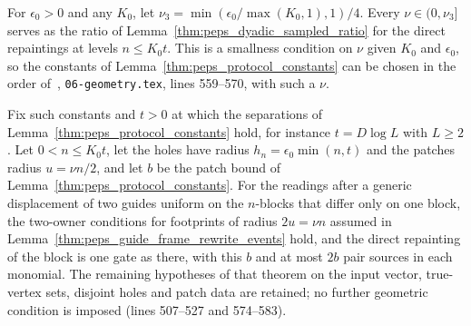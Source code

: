 \begin{lemma}
    \label{thm:peps_dyadic_direct_repainting_constants}
    \leanok
    For $\epsilon_0>0$ and any $K_0$, let
    $\nu_3=\min(\epsilon_0/\max(K_0,1),1)/4$. Every $\nu\in(0,\nu_3]$ serves as
    the ratio of Lemma~\ref{thm:peps_dyadic_sampled_ratio} for the direct
    repaintings at levels $n\le K_0t$. This is a smallness condition on
    $\nu$ given $K_0$ and $\epsilon_0$, so the constants of
    Lemma~\ref{thm:peps_protocol_constants} can be chosen in the order
    of~\cite[Section~7]{OpenAI2026PolynomialPEPS}, \texttt{06-geometry.tex}, lines
    559--570, with such a $\nu$.

    Fix such constants and $t>0$ at which the separations of
    Lemma~\ref{thm:peps_protocol_constants} hold, for instance $t=D\log L$ with
    $L\ge2$. Let $0<n\le K_0t$, let the holes have radius $h_n=\epsilon_0\min(n,t)$ and
    the patches radius $u=\nu n/2$, and let $b$ be the patch bound of
    Lemma~\ref{thm:peps_protocol_constants}. For the readings after a generic
    displacement of two guides uniform on the $n$-blocks that differ only on one block,
    the two-owner conditions for footprints of radius $2u=\nu n$ assumed in
    Lemma~\ref{thm:peps_guide_frame_rewrite_events} hold, and the direct repainting of
    the block is one gate as there, with this $b$ and at most $2b$ pair sources in
    each monomial. The remaining hypotheses of that theorem on the input vector,
    true-vertex sets, disjoint holes and patch data are retained; no further geometric
    condition is imposed (lines 507--527 and 574--583).
\end{lemma}

